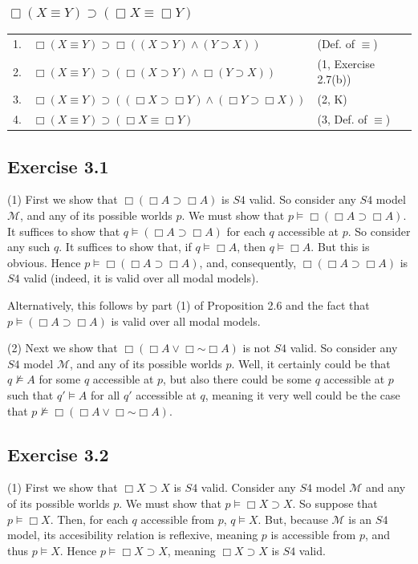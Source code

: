 \documentclass{article}
\newcommand*{\oldneg}{\mathord{\sim}}
\theoremstyle{definition}
\begin{document}
\subsubsection*{$\Box(X\equiv Y)\supset (\Box X\equiv\Box Y)$}
\begin{center}
\begin{tabular}{lll}
1. & $\Box(X\equiv Y)\supset\Box((X\supset Y)\wedge (Y\supset X))$ & (Def. of $\equiv$) \\
2. & $\Box(X\equiv Y)\supset(\Box(X\supset Y)\wedge\Box(Y\supset X))$ & (1, Exercise 2.7(b)) \\
3. & $\Box(X\equiv Y)\supset((\Box X\supset\Box Y)\wedge(\Box Y\supset\Box X))$ & (2, K) \\
4. & $\Box (X\equiv Y)\supset(\Box X\equiv\Box Y)$ & (3, Def. of $\equiv$)
\end{tabular}
\end{center}

\subsection*{Exercise 3.1}
(1) First we show that $\Box(\Box A\supset\Box A)$ is $S4$ valid. So consider any $S4$ model $\mathcal{M}$, and any 
of its possible worlds $p$. We must show that 
$p\vDash\Box(\Box A\supset\Box A)$. It suffices to show that 
$q\vDash (\Box A\supset\Box A)$ for each $q$ accessible at $p$. So consider any such $q$.
It suffices to show that, if $q\vDash\Box A$, then $q\vDash\Box A$. But this is obvious.
Hence $p\vDash\Box(\Box A\supset\Box A)$, and, consequently, $\Box(\Box A\supset\Box A)$ is 
$S4$ valid (indeed, it is valid over all modal models).

Alternatively, this follows by part (1) of Proposition 2.6 and the fact that $p\vDash (\Box A\supset\Box A)$ is valid over all 
modal models.

(2) Next we show that $\Box(\Box A\vee\Box\oldneg\Box A)$ is not $S4$ valid. So consider any $S4$ model $\mathcal{M}$, and 
any of its possible worlds $p$. Well, it certainly could be that 
$q\nvDash A$ for some $q$ accessible at $p$, but also there could be some 
$q$ accessible at $p$ such that $q'\vDash A$ for all $q'$ accessible at $q$, meaning it very well could be the case that 
$p\nvDash\Box(\Box A\vee\Box\oldneg\Box A)$.

\subsection*{Exercise 3.2}
(1) First we show that $\Box X\supset X$ is $S4$ valid. Consider any $S4$ model $\mathcal{M}$ and any of its possible 
worlds $p$. We must show that $p\vDash\Box X\supset X$. So suppose that 
$p\vDash\Box X$. Then, for each $q$ accessible from $p$, $q\vDash X$. But, because $\mathcal{M}$ is an $S4$ model, its 
accesibility relation is 
reflexive, meaning $p$ is accessible from $p$, and thus $p\vDash X$. Hence $p\vDash\Box X\supset X$, meaning 
$\Box X\supset X$ is $S4$ valid.
\end{document}
